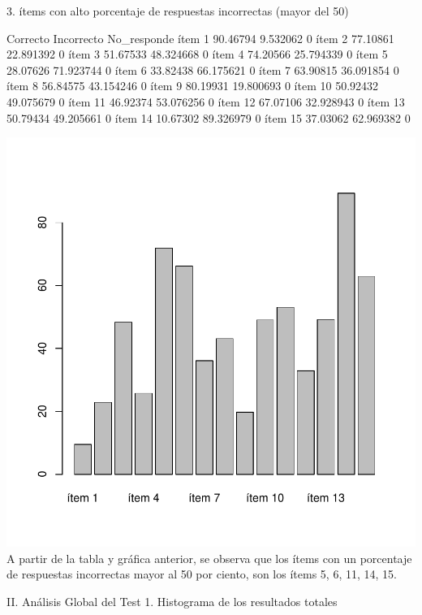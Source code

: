 \documentclass{article}
\begin{document}
3.	ítems con alto porcentaje de respuestas incorrectas (mayor del 50) 
\begin{Schunk}
\begin{Soutput}
        Correcto Incorrecto No_responde
ítem 1  90.46794   9.532062           0
ítem 2  77.10861  22.891392           0
ítem 3  51.67533  48.324668           0
ítem 4  74.20566  25.794339           0
ítem 5  28.07626  71.923744           0
ítem 6  33.82438  66.175621           0
ítem 7  63.90815  36.091854           0
ítem 8  56.84575  43.154246           0
ítem 9  80.19931  19.800693           0
ítem 10 50.92432  49.075679           0
ítem 11 46.92374  53.076256           0
ítem 12 67.07106  32.928943           0
ítem 13 50.79434  49.205661           0
ítem 14 10.67302  89.326979           0
ítem 15 37.03062  62.969382           0
\end{Soutput}
\end{Schunk}
\includegraphics{Documento_de_prueba-004}
A partir de la tabla y gráfica anterior, se observa que los ítems con un porcentaje de respuestas incorrectas mayor al 50 por ciento, son los ítems 5, 6, 11, 14, 15.

II.	Análisis Global del Test
1. Histograma de los resultados totales
\end{document}
